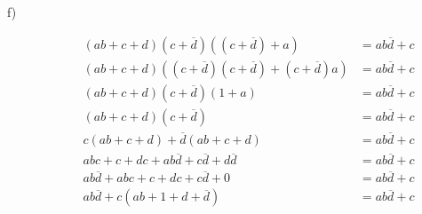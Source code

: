 \documentclass[catalan,border=15pt,class=scrartcl,multi=minipage]{standalone}
\begin{document}
\begin{minipage}{30em}
\begin{description}
\item[{f)}] \begin{align*}
  \left(ab + c + d\right)\left(c + \overline{d}\right)\left(\left(c + \overline{d}\right) + a\right) &= ab\overline{d} + c \\
  \left(ab + c + d\right)\left(\left(c + \overline{d}\right)\left(c + \overline{d}\right) + \left(c + \overline{d}\right)a\right) &= ab\overline{d} + c \\
  \left(ab + c + d\right)\left(c + \overline{d}\right)\left(1 + a\right) &= ab\overline{d} + c \\
  \left(ab + c + d\right)\left(c + \overline{d}\right) &= ab\overline{d} + c \\
  c\left(ab + c + d\right) + \overline{d}\left(ab + c + d\right) &= ab\overline{d} + c \\
  abc + c + dc + ab\overline{d} + c\overline{d} + d\overline{d} &= ab\overline{d} + c \\
  ab\overline{d} + abc + c + dc + c\overline{d} + 0 &= ab\overline{d} + c \\
  ab\overline{d} + c\left(ab + 1 + d + \overline{d}\right) &= ab\overline{d} + c
\end{align*}

\end{description}

\end{minipage}
\end{document}
